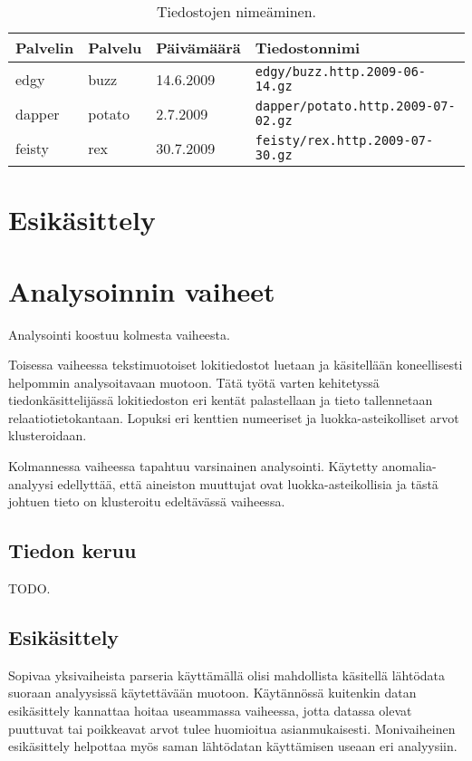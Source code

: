 \begin{table}[h]
\centering
\begin{tabular}{llll}
Palvelin & Palvelu & Päivämäärä & Tiedostonnimi \\
\hline
edgy & buzz & 14.6.2009 & \texttt{edgy/buzz.http.2009-06-14.gz}\\ 
dapper & potato & 2.7.2009 & \texttt{dapper/potato.http.2009-07-02.gz}\\
feisty & rex & 30.7.2009 & \texttt{feisty/rex.http.2009-07-30.gz}\\
\end{tabular}
\caption{Tiedostojen nimeäminen.}
\label{tiedostot}
\end{table}


\section{Esikäsittely}

\section{Analysoinnin vaiheet}

Analysointi koostuu kolmesta vaiheesta.

Toisessa vaiheessa tekstimuotoiset lokitiedostot luetaan ja
käsitellään koneellisesti helpommin analysoitavaan
muotoon. Tätä työtä varten kehitetyssä tiedonkäsittelijässä
lokitiedoston eri kentät palastellaan ja tieto tallennetaan
relaatiotietokantaan. Lopuksi eri kenttien numeeriset ja
luokka-asteikolliset arvot klusteroidaan.

Kolmannessa vaiheessa tapahtuu varsinainen analysointi. Käytetty
anomalia-analyysi edellyttää, että aineiston muuttujat ovat
luokka-asteikollisia ja tästä johtuen tieto on klusteroitu edeltävässä vaiheessa.

\subsection{Tiedon keruu}

TODO.

\subsection{Esikäsittely}

Sopivaa yksivaiheista parseria käyttämällä olisi mahdollista käsitellä
lähtödata suoraan analyysissä käytettävään muotoon. Käytännössä kuitenkin datan
esikäsittely kannattaa hoitaa useammassa vaiheessa, jotta datassa
olevat puuttuvat tai poikkeavat arvot tulee huomioitua
asianmukaisesti. Monivaiheinen esikäsittely helpottaa myös saman
lähtödatan käyttämisen useaan eri analyysiin.


